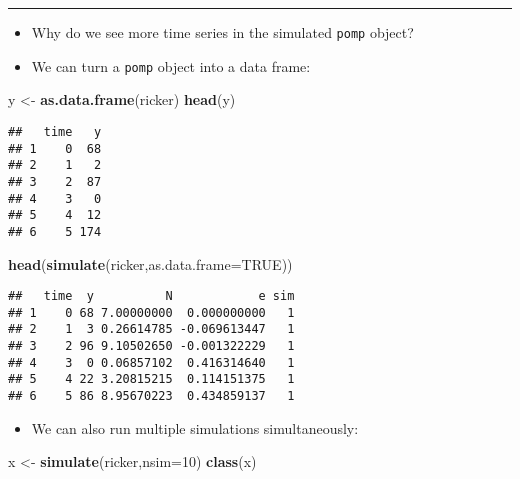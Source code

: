 \documentclass[]{article}
\newenvironment{Shaded}{\begin{snugshade}}{\end{snugshade}}
\newcommand{\KeywordTok}[1]{\textcolor[rgb]{0.13,0.29,0.53}{\textbf{#1}}}
\newcommand{\DataTypeTok}[1]{\textcolor[rgb]{0.13,0.29,0.53}{#1}}
\newcommand{\DecValTok}[1]{\textcolor[rgb]{0.00,0.00,0.81}{#1}}
\newcommand{\StringTok}[1]{\textcolor[rgb]{0.31,0.60,0.02}{#1}}
\newcommand{\OtherTok}[1]{\textcolor[rgb]{0.56,0.35,0.01}{#1}}
\newcommand{\NormalTok}[1]{#1}
\providecommand{\tightlist}{%
  \setlength{\itemsep}{0pt}\setlength{\parskip}{0pt}}
\begin{document}
\begin{center}\rule{0.5\linewidth}{\linethickness}\end{center}

\begin{itemize}
\item
  Why do we see more time series in the simulated \texttt{pomp} object?
\item
  We can turn a \texttt{pomp} object into a data frame:
\end{itemize}

\begin{Shaded}
\begin{Highlighting}[]
\NormalTok{y <-}\StringTok{ }\KeywordTok{as.data.frame}\NormalTok{(ricker)}
\KeywordTok{head}\NormalTok{(y)}
\end{Highlighting}
\end{Shaded}

\begin{verbatim}
##   time   y
## 1    0  68
## 2    1   2
## 3    2  87
## 4    3   0
## 5    4  12
## 6    5 174
\end{verbatim}

\begin{Shaded}
\begin{Highlighting}[]
\KeywordTok{head}\NormalTok{(}\KeywordTok{simulate}\NormalTok{(ricker,}\DataTypeTok{as.data.frame=}\OtherTok{TRUE}\NormalTok{))}
\end{Highlighting}
\end{Shaded}

\begin{verbatim}
##   time  y          N            e sim
## 1    0 68 7.00000000  0.000000000   1
## 2    1  3 0.26614785 -0.069613447   1
## 3    2 96 9.10502650 -0.001322229   1
## 4    3  0 0.06857102  0.416314640   1
## 5    4 22 3.20815215  0.114151375   1
## 6    5 86 8.95670223  0.434859137   1
\end{verbatim}

\begin{itemize}
\tightlist
\item
  We can also run multiple simulations simultaneously:
\end{itemize}

\begin{Shaded}
\begin{Highlighting}[]
\NormalTok{x <-}\StringTok{ }\KeywordTok{simulate}\NormalTok{(ricker,}\DataTypeTok{nsim=}\DecValTok{10}\NormalTok{)}
\KeywordTok{class}\NormalTok{(x)}
\end{Highlighting}
\end{Shaded}
\end{document}
